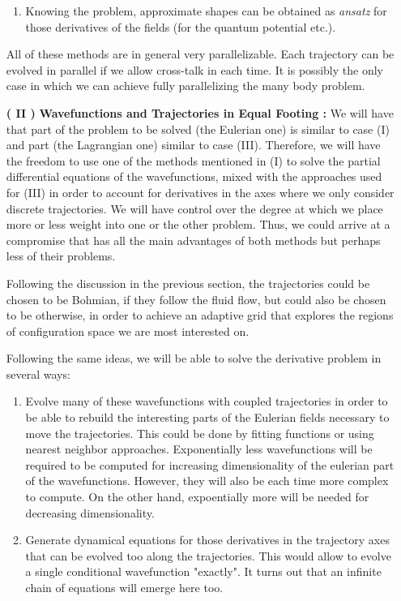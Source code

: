 \documentclass[11pt, a4paper]{article} %
\begin{document}
\begin{enumerate}
\begin{enumerate}
\item Knowing the problem, approximate shapes can be obtained as {\em ansatz} for those derivatives of the fields (for the quantum potential etc.).

\end{enumerate}
All of these methods are in general very parallelizable. Each trajectory can be evolved in parallel if we allow cross-talk in each time. It is possibly the only case in which we can achieve fully parallelizing the many body problem.

\item [\bf ( II )] {\bf Wavefunctions and Trajectories in Equal Footing :} We will have that part of the problem to be solved (the Eulerian one) is similar to case (I) and part (the Lagrangian one) similar to case (III). Therefore, we will have the freedom to use one of the methods mentioned in (I) to solve the partial differential equations of the wavefunctions, mixed with the approaches used for (III) in order to account for derivatives in the axes where we only consider discrete trajectories. We will have control over the degree at which we place more or less weight into one or the other problem. Thus, we could arrive at a compromise that has all the main advantages of both methods but perhaps less of their problems.

Following the discussion in the previous section, the trajectories could be chosen to be Bohmian, if they follow the fluid flow, but could also be chosen to be otherwise, in order to achieve an adaptive grid that explores the regions of configuration space we are most interested on.

Following the same ideas, we will be able to solve the derivative problem in several ways:
\begin{enumerate}
\item Evolve many of these wavefunctions with coupled trajectories in order to be able to rebuild the interesting parts of the Eulerian fields necessary to move the trajectories. This could be done by fitting functions or using nearest neighbor approaches. Exponentially less wavefunctions will be required to be computed for increasing dimensionality of the eulerian part of the wavefunctions. However, they will also be each time more complex to compute. On the other hand, expoentially more will be needed for decreasing dimensionality.

\item Generate dynamical equations for those derivatives in the trajectory axes that can be evolved too along the trajectories. This would allow to evolve a single conditional wavefunction "exactly". It turns out that an infinite chain of equations will emerge here too.


\end{enumerate}
\end{enumerate}
\end{document}
